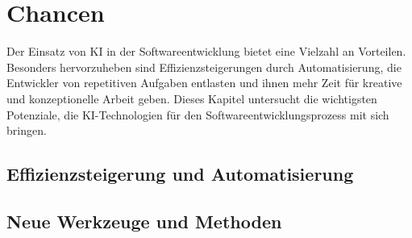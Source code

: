 \chapter{Chancen}
Der Einsatz von KI in der Softwareentwicklung bietet eine Vielzahl an Vorteilen. Besonders hervorzuheben sind Effizienzsteigerungen durch Automatisierung, die Entwickler von repetitiven Aufgaben entlasten und ihnen mehr Zeit für kreative und konzeptionelle Arbeit geben. Dieses Kapitel untersucht die wichtigsten Potenziale, die KI-Technologien für den Softwareentwicklungsprozess mit sich bringen.
\section{Effizienzsteigerung und Automatisierung}


\section{Neue Werkzeuge und Methoden}



